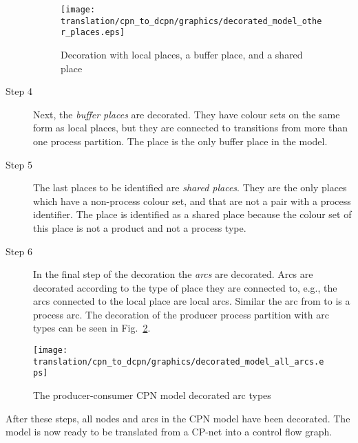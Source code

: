\begin{description}
\begin{figure}[h!]
\centering
\texttt{[image: translation/cpn\_to\_dcpn/graphics/decorated\_model\_other\_places.eps]}
\caption{Decoration with local places, a buffer place, and a shared place}
\label{fig:decoratedproducerconsumerotherplaces}
\end{figure}

\newpage

\item[Step 4] Next, the \emph{buffer places} are decorated. They have colour sets on the same form as local places, but they are connected to transitions from more than one process partition. The place  is the only buffer place in the model.

\item[Step 5] The last places to be identified are \emph{shared places}. They are the only places which have a non-process colour set, and that are not a pair with a process identifier. The place  is identified as a shared place because the colour set of this place is not a product and not a process type.

\item[Step 6] In the final step of the decoration the \emph{arcs} are decorated. Arcs are decorated according to the type of place they are connected to, e.g., the arcs connected to the local place  are local arcs. Similar the arc from  to  is a process arc. The decoration of the producer process partition with arc types can be seen in Fig.~\ref{fig:decoratedproducerconsumerallarcs}.
\end{description}

\begin{figure}[h!]
\centering
\texttt{[image: translation/cpn\_to\_dcpn/graphics/decorated\_model\_all\_arcs.eps]}
\caption{The producer-consumer CPN model decorated arc types}
\label{fig:decoratedproducerconsumerallarcs}
\end{figure}

After these steps, all nodes and arcs in the CPN model have been decorated. The model is now ready to be translated from a CP-net into a control flow graph.
